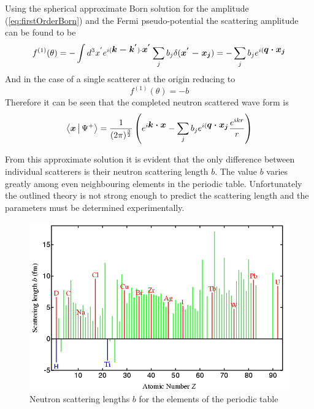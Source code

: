 Using the spherical approximate Born solution for the amplitude (\ref{eq:firstOrderBorn}) and the Fermi pseudo-potential the scattering amplitude can be found to be 
\begin{equation}
f^{(1)}(\theta) = -\int d^3x^{'}e^{i(\mbox{\boldmath$k-k^{'}$})\cdot \mbox{\boldmath$x^{'}$}}\sum\limits_{j} b_j \delta(\mbox{\boldmath$x^{'}-x_j$})=-\sum\limits_{j}b_j e^{i(\mbox{\boldmath$q \cdot x_j$}}
\label{eq:neutronScatteringAmplitude}
\end{equation}
And in the case of a single scatterer at the origin reducing to 
\begin{equation}
f^{(1)}(\theta)  = -b
\label{eq:neutronScatteringSingle}
\end{equation}
Therefore it can be seen that the completed neutron scattered wave form is
\begin{equation}
\label{eq:scatterNeutronWaveForm}
\Braket{\mbox{\boldmath$x$}|\Psi^{+}} = \frac{1}{(2\pi)^{\frac{3}{2}}}\left(e^{i\mbox{\boldmath$k \cdot x$}} - \sum\limits_{j}b_j e^{i(\mbox{\boldmath$q \cdot x_j$}}\frac{e^{ikr}}{r}\right)
\end{equation}

From this approximate solution it is evident that the only difference between individual scatterers is their neutron scattering length $b$. The value $b$ varies greatly among even neighbouring elements in the periodic table. Unfortunately the outlined theory is not strong enough to predict the scattering length and the parameters must be determined experimentally. 

\begin{figure}[ht!]
\centering
\includegraphics[scale=0.5]{Figures/neutronScatteringLength.png}
\caption{Neutron scattering lengths $b$ for the elements of the periodic table }
\label{fig:scatteringLength}
\end{figure}

